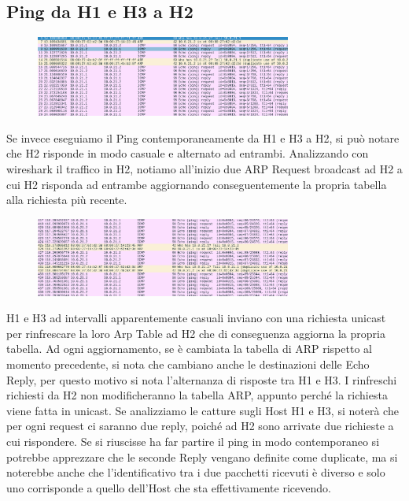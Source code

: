 \documentclass{article}
\begin{document}
\vspace{2cm}
\subsection{Ping da H1 e H3 a H2}



\begin{figure} %
  \vspace{-10pt}
    \centering
      \includegraphics[width=0.75\textwidth]{es2.2host2.png}
\end{figure}
Se invece eseguiamo il Ping contemporaneamente da H1 e H3 a H2, si può notare che H2 risponde in modo casuale e alternato ad entrambi.
Analizzando con wireshark il traffico in H2, notiamo all’inizio due ARP Request broadcast ad H2 a cui H2 risponda ad entrambe aggiornando conseguentemente la propria tabella alla richiesta più recente.
\pagebreak
 \begin{figure} %
  \centering
    \includegraphics[width=0.75\textwidth]{Commutazione.png}
\end{figure}

H1 e H3 ad intervalli apparentemente casuali inviano con una richiesta unicast per rinfrescare la loro Arp Table ad H2 che di conseguenza aggiorna la propria tabella. Ad ogni aggiornamento, se è cambiata la tabella di ARP rispetto al momento precedente, si nota che cambiano anche le destinazioni delle Echo Reply, per questo motivo si nota l’alternanza di risposte tra H1 e H3.
I rinfreschi richiesti da H2 non modificheranno la tabella ARP, appunto perché la richiesta viene fatta in unicast.
Se analizziamo le catture sugli Host H1 e H3, si noterà che per ogni request ci saranno due reply, poiché ad H2 sono arrivate due richieste a cui rispondere. Se si riuscisse ha far partire il ping in modo contemporaneo si potrebbe apprezzare che le seconde Reply vengano definite come duplicate, ma si noterebbe anche che l’identificativo tra i due pacchetti ricevuti è diverso e solo uno corrisponde a quello dell’Host che sta effettivamente ricevendo.
\end{document}
